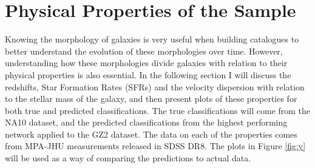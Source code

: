 \documentclass[12pt, onecolumn]{aa}
\begin{document}
\section{Physical Properties of the Sample} \label{sec:physical_prop}
Knowing the morphology of galaxies is very useful when building catalogues to better understand the evolution of these morphologies over time. However, understanding how these morphologies divide galaxies with relation to their physical properties is also essential. In the following section I will discuss the redshifts, Star Formation Rates (SFRs) and the velocity dispersion with relation to the stellar mass of the galaxy, and then present plots of these properties for both true and predicted classifications. The true classifications will come from the NA10 dataset, and the predicted classifications from the highest performing network applied to the GZ2 dataset. The data on each of the properties comes from MPA-JHU measurements released in SDSS DR8. The plots in Figure \ref{fig:y} will be used as a way of comparing the predictions to actual data. \\
\end{document}

